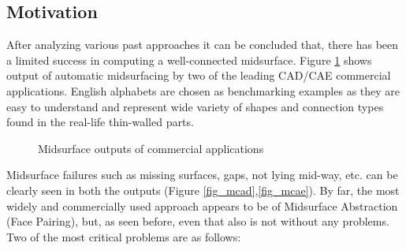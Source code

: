 
\subsection{Motivation}
After analyzing various past approaches it can be concluded that, there has been a limited success in computing a well-connected midsurface. Figure \ref{fig_comm} shows output of automatic midsurfacing by two of the leading CAD/CAE commercial applications. English alphabets are chosen as benchmarking examples as they are easy to understand and represent wide variety of shapes and connection types found in the real-life thin-walled parts.

\begin{figure}[h!]
\centering     %
{} \quad
{} \quad
{} 
\caption{Midsurface outputs of commercial applications}
  \label{fig_comm}
\end{figure}

Midsurface failures such as missing surfaces, gaps, not lying mid-way, etc. can be clearly seen in both the outputs (Figure \ref{fig_mcad},\ref{fig_mcae}). By far, the most widely and commercially used approach appears to be of Midsurface Abstraction (Face Pairing), but, as seen before, even that also is not without any problems. Two of the most critical problems are as follows:

